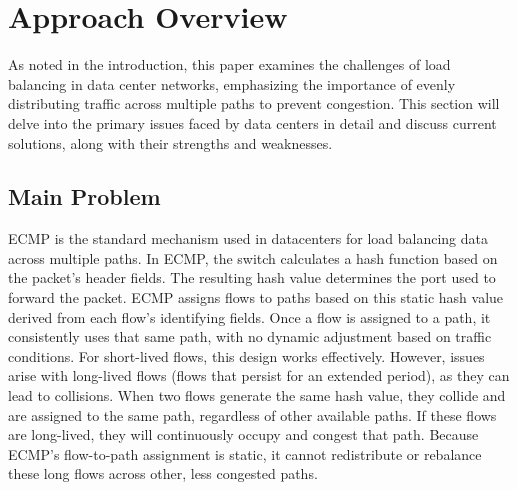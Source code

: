 \documentclass[11pt, sigplan]{acmart}
\begin{document}
\section{Approach Overview}
As noted in the introduction, this paper examines the challenges of load balancing in data center networks, emphasizing the importance of evenly distributing traffic across multiple paths to prevent congestion. This section will delve into the primary issues faced by data centers in detail and discuss current solutions, along with their strengths and weaknesses.

\subsection{Main Problem}

ECMP is the standard mechanism used in datacenters for load balancing data across multiple paths. In ECMP, the switch calculates a hash function based on the packet’s header fields. The resulting hash value determines the port used to forward the packet. ECMP assigns flows to paths based on this static hash value derived from each flow’s identifying fields. Once a flow is assigned to a path, it consistently uses that same path, with no dynamic adjustment based on traffic conditions. For short-lived flows, this design works effectively. However, issues arise with long-lived flows (flows that persist for an extended period), as they can lead to collisions. When two flows generate the same hash value, they collide and are assigned to the same path, regardless of other available paths. If these flows are long-lived, they will continuously occupy and congest that path. Because ECMP’s flow-to-path assignment is static, it cannot redistribute or rebalance these long flows across other, less congested paths.
\end{document}
